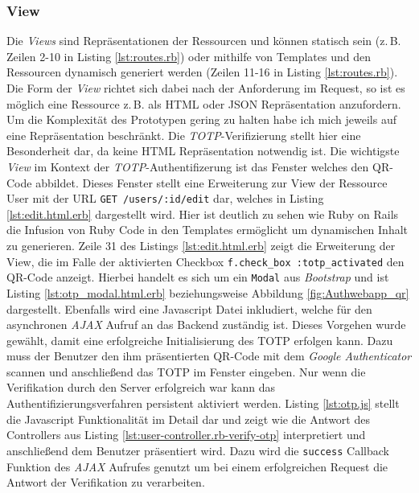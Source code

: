 \documentclass[11pt,a4paper,ngerman]{scrreprt}
\begin{document}
\subsubsection{View}
Die \textit{Views} sind Repräsentationen der Ressourcen und können statisch sein (z.\,B. Zeilen 2-10 in Listing \ref{lst:routes.rb}) oder mithilfe von Templates und den Ressourcen dynamisch generiert werden (Zeilen 11-16 in Listing \ref{lst:routes.rb}). Die Form der \textit{View} richtet sich dabei nach der Anforderung im Request, so ist es möglich eine Ressource z.\,B. als HTML oder JSON Repräsentation anzufordern. Um die Komplexität des Prototypen gering zu halten habe ich mich jeweils auf eine Repräsentation beschränkt. Die \textit{TOTP}-Verifizierung stellt hier eine Besonderheit dar, da keine HTML Repräsentation notwendig ist. Die wichtigste \textit{View} im Kontext der \textit{TOTP}-Authentifizerung ist das Fenster welches den QR-Code abbildet. Dieses Fenster stellt eine Erweiterung zur View der Ressource User mit der URL \texttt{GET /users/:id/edit} dar, welches in Listing \ref{lst:edit.html.erb} dargestellt wird. Hier ist deutlich zu sehen wie Ruby on Rails die Infusion von Ruby Code in den Templates ermöglicht um dynamischen Inhalt zu generieren. Zeile 31 des Listings \ref{lst:edit.html.erb} zeigt die Erweiterung der View, die im Falle der aktivierten Checkbox \texttt{f.check\_box :totp\_activated} den QR-Code anzeigt. Hierbei handelt es sich um ein \texttt{Modal} aus \textit{Bootstrap} und ist Listing \ref{lst:otp_modal.html.erb} beziehungsweise Abbildung \ref{fig:Authwebapp_qr} dargestellt. Ebenfalls wird eine Javascript Datei inkludiert, welche für den asynchronen \textit{AJAX} Aufruf an das Backend zuständig ist. Dieses Vorgehen wurde gewählt, damit eine erfolgreiche Initialisierung des TOTP erfolgen kann. Dazu muss der Benutzer den ihm präsentierten QR-Code mit dem \textit{Google Authenticator} scannen und anschließend das TOTP im Fenster eingeben. Nur wenn die Verifikation durch den Server erfolgreich war kann das Authentifizierungsverfahren persistent aktiviert werden. Listing \ref{lst:otp.js} stellt die Javascript Funktionalität im Detail dar und zeigt wie die Antwort des Controllers aus Listing \ref{lst:user-controller.rb-verify-otp} interpretiert und anschließend dem Benutzer präsentiert wird. Dazu wird die \texttt{success} Callback Funktion des \textit{AJAX} Aufrufes genutzt um bei einem erfolgreichen Request die Antwort der Verifikation zu verarbeiten.
\end{document}
